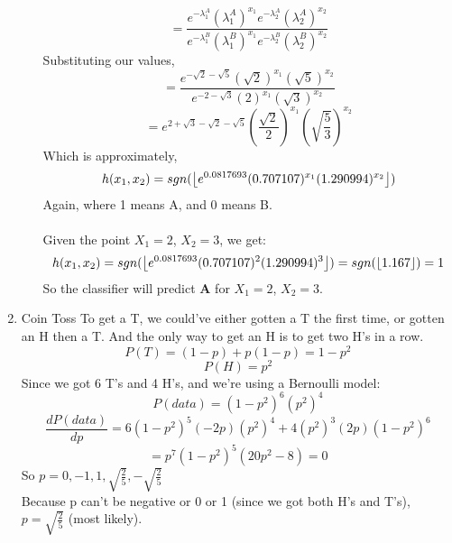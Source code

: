 \begin{enumerate}
\begin{enumerate}
    $$=\frac{e^{-\lambda_1^A}(\lambda_1^A)^{x_1}e^{-\lambda_2^A}(\lambda_2^A)^{x_2}}{e^{-\lambda_1^B}(\lambda_1^B)^{x_1}e^{-\lambda_2^B}(\lambda_2^B)^{x_2}}$$
    Substituting our values,
    $$=\frac{e^{-\sqrt{2}-\sqrt{5}}(\sqrt{2})^{x_1}(\sqrt{5})^{x_2}}{e^{-2-\sqrt{3}}(2)^{x_1}(\sqrt{3})^{x_2}}$$
    $$=e^{2 + \sqrt{3}-\sqrt{2}-\sqrt{5}}(\frac{\sqrt{2}}{2})^{x_1}(\sqrt{\frac{5}{3}})^{x_2}$$
    Which is approximately,
    $$h(x_1,x_2)=sgn(\floor*{e^{0.0817693}(0.707107)^{x_1}(1.290994)^{x_2}})$$
    Again, where 1 means A, and 0 means B.\\\\
    Given the point $X_1=2$, $X_2=3$, we get:
    $$h(x_1,x_2)=sgn(\floor*{e^{0.0817693}(0.707107)^{2}(1.290994)^{3}})=sgn(\floor*{1.167})=1$$
    So the classifier will predict \textbf{A} for $X_1=2$, $X_2=3$.
  \end{enumerate}
  \item Coin Toss
    To get a T, we could've either gotten a T the first time, or gotten an H then a T. And the only way to get an H is to get two H's in a row.
    $$P(T) = (1-p) + p(1-p) = 1-p^2$$
    $$P(H) = p^2$$
    Since we got 6 T's and 4 H's, and we're using a Bernoulli model:
    $$P(data) = (1-p^2)^6 (p^2)^4$$
    $$\frac{dP(data)}{dp} = 6(1-p^2)^5 (-2p)(p^2)^4 + 4(p^2)^3 (2p)(1-p^2)^6$$    
    $$=p^7(1-p^2)^5 (20p^2-8) = 0$$
    So $p=0,-1,1,\sqrt{\frac{2}{5}}, -\sqrt{\frac{2}{5}}$\\
    Because p can't be negative or 0 or 1 (since we got both H's and T's), $p=\sqrt{\frac{2}{5}}$ (most likely).
\end{enumerate}


